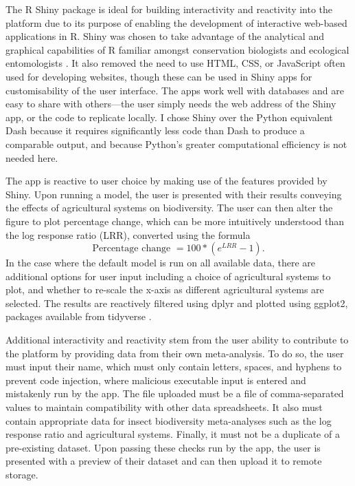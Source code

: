 \documentclass[11pt]{article}
\begin{document}
			\noindent The R Shiny package \parencite{chang2022shiny} is ideal for building interactivity and reactivity into the platform due to its purpose of enabling the development of interactive web-based applications in R. Shiny was chosen to take advantage of the analytical and graphical capabilities of R familiar amongst conservation biologists and ecological entomologists \parencite{lai2019evaluating}. It also removed the need to use HTML, CSS, or JavaScript often used for developing websites, though these can be used in Shiny apps for customisability of the user interface. The apps work well with databases and are easy to share with others—the user simply needs the web address of the Shiny app, or the code to replicate locally. I chose Shiny over the Python equivalent Dash \parencite{hossain2019visualization} because it requires significantly less code than Dash to produce a comparable output, and because Python’s greater computational efficiency is not needed here. 
			
			\noindent The app is reactive to user choice by making use of the features provided by Shiny. Upon running a model, the user is presented with their results conveying the effects of agricultural systems on biodiversity. The user can then alter the figure to plot percentage change, which can be more intuitively understood than the log response ratio (LRR), converted using the formula
			\begin{equation}
				\mbox{Percentage change } = 100 * (e^{LRR} - 1). %
			\end{equation}
			\noindent In the case where the default model is run on all available data, there are additional options for user input including a choice of agricultural systems to plot, and whether to re-scale the x-axis as different agricultural systems are selected. The results are reactively filtered using dplyr and plotted using ggplot2, packages available from tidyverse \parencite{wickham2019welcome}. 
			
			\noindent Additional interactivity and reactivity stem from the user ability to contribute to the platform by providing data from their own meta-analysis. To do so, the user must input their name, which must only contain letters, spaces, and hyphens to prevent code injection, where malicious executable input is entered and mistakenly run by the app. The file uploaded must be a file of comma-separated values to maintain compatibility with other data spreadsheets. It also must contain appropriate data for insect biodiversity meta-analyses such as the log response ratio and agricultural systems. Finally, it must not be a duplicate of a pre-existing dataset. Upon passing these checks run by the app, the user is presented with a preview of their dataset and can then upload it to remote storage. 
			
\end{document}
